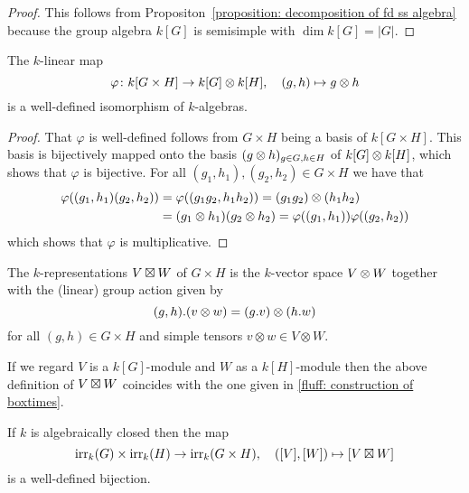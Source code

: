 \begin{proof}
  This follows from Propositon~\ref{proposition: decomposition of fd ss algebra} because the group algebra $k[G]$ is semisimple with $\dim k[G] = |G|$.
\end{proof}


\begin{lemma}
  \label{lemma: group algebra of product}
  The $k$-linear map
  \[
            \varphi
    \colon  k[G \times H]
    \to     k[G] \mathbin{\otimes} k[H],
    \quad   (g,h)
    \mapsto g \mathbin{\otimes} h
  \]
  is a well-defined isomorphism of $k$-algebras.
\end{lemma}


\begin{proof}
  That $\varphi$ is well-defined follows from $G \times H$ being a basis of $k[G \times H]$.
  This basis is bijectively mapped onto the basis $(g \mathbin{\otimes} h)_{g \in G, h \in H}$ of $k[G] \mathbin{\otimes} k[H]$, which shows that $\varphi$ is bijective.
  For all $(g_1, h_1), (g_2, h_2) \in G \times H$ we have that
  \begin{align*}
      \varphi((g_1, h_1) (g_2, h_2))
    &= \varphi((g_1 g_2, h_1 h_2))
     = (g_1 g_2) \mathbin{\otimes} (h_1 h_2)  \\
    &= (g_1 \mathbin{\otimes} h_1) (g_2 \mathbin{\otimes} h_2)
     = \varphi((g_1, h_1)) \varphi((g_2, h_2))
  \end{align*}
  which shows that $\varphi$ is multiplicative.
\end{proof}


\begin{definition}
  The $k$-representations $V \mathbin{\boxtimes} W$ of $G \times H$ is the $k$-vector space $V \mathbin{\otimes} W$ together with the (linear) group action given by
  \[
      (g,h).(v \mathbin{\otimes} w)
    = (g.v) \mathbin{\otimes} (h.w)
  \]
  for all $(g, h) \in G \times H$ and simple tensors $v \otimes w \in V \otimes W$.
\end{definition}


\begin{remark}
  \label{remark: definitions of boxtimes coincide}
  If we regard $V$ is a $k[G]$-module and $W$ as a $k[H]$-module then the above definition of $V \mathbin{\boxtimes} W$ coincides with the one given in \ref{fluff: construction of boxtimes}.
\end{remark}


\begin{corollary}
  \label{corollary: irr rep of products}
  If $k$ is algebraically closed then the map
  \[
            \operatorname{irr}_k(G) \times \operatorname{irr}_k(H)
    \to     \operatorname{irr}_k(G \times H),
    \quad   ([V],[W])
    \mapsto [V \mathbin{\mathbin{\boxtimes}} W]
  \]
  is a well-defined bijection.
\end{corollary}


